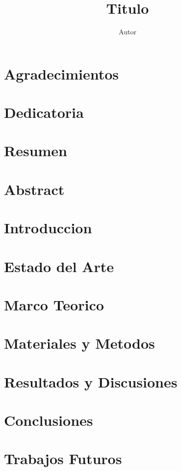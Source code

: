 \documentclass[12pt,a4paper]{report}
\author{Autor}
\title{Titulo}
\begin{document}

\chapter*{Agradecimientos}
\chapter*{Dedicatoria}
\tableofcontents
\listoffigures
\listoftables
\chapter*{Resumen}
\chapter*{Abstract}
\chapter{Introduccion}


\chapter{Estado del Arte}


\chapter{Marco Teorico}


\chapter{Materiales y Metodos}


\chapter{Resultados y Discusiones}


\chapter{Conclusiones}


\chapter{Trabajos Futuros}


\printbibliography[heading=bibintoc,title={Bibliografia}]

\appendix
\chapter{}

\end{document}
